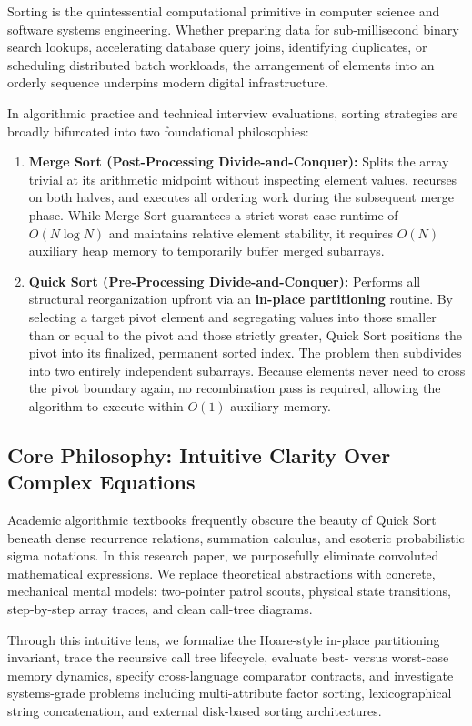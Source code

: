 \documentclass[10pt,journal,compsoc,onecolumn]{IEEEtran}
\begin{document}
Sorting is the quintessential computational primitive in computer science and software systems engineering. Whether preparing data for sub-millisecond binary search lookups, accelerating database query joins, identifying duplicates, or scheduling distributed batch workloads, the arrangement of elements into an orderly sequence underpins modern digital infrastructure.

In algorithmic practice and technical interview evaluations, sorting strategies are broadly bifurcated into two foundational philosophies:
\begin{enumerate}
    \item \textbf{Merge Sort (Post-Processing Divide-and-Conquer):} Splits the array trivial at its arithmetic midpoint without inspecting element values, recurses on both halves, and executes all ordering work during the subsequent merge phase. While Merge Sort guarantees a strict worst-case runtime of $O(N \log N)$ and maintains relative element stability, it requires $O(N)$ auxiliary heap memory to temporarily buffer merged subarrays.
    \item \textbf{Quick Sort (Pre-Processing Divide-and-Conquer):} Performs all structural reorganization upfront via an \textbf{in-place partitioning} routine. By selecting a target pivot element and segregating values into those smaller than or equal to the pivot and those strictly greater, Quick Sort positions the pivot into its finalized, permanent sorted index. The problem then subdivides into two entirely independent subarrays. Because elements never need to cross the pivot boundary again, no recombination pass is required, allowing the algorithm to execute within $O(1)$ auxiliary memory.
\end{enumerate}

\subsection{Core Philosophy: Intuitive Clarity Over Complex Equations}

Academic algorithmic textbooks frequently obscure the beauty of Quick Sort beneath dense recurrence relations, summation calculus, and esoteric probabilistic sigma notations. In this research paper, we purposefully eliminate convoluted mathematical expressions. We replace theoretical abstractions with concrete, mechanical mental models: two-pointer patrol scouts, physical state transitions, step-by-step array traces, and clean call-tree diagrams.

Through this intuitive lens, we formalize the Hoare-style in-place partitioning invariant, trace the recursive call tree lifecycle, evaluate best- versus worst-case memory dynamics, specify cross-language comparator contracts, and investigate systems-grade problems including multi-attribute factor sorting, lexicographical string concatenation, and external disk-based sorting architectures.
\end{document}
